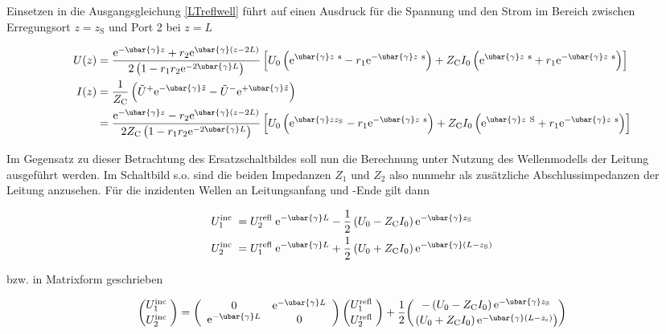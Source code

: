 Einsetzen in die Ausgangsgleichung \ref{LTreflwell} führt auf einen Ausdruck für die Spannung und den Strom im Bereich zwischen Erregungsort $z=z_{\mathrm{S}}$ und Port 2 bei $z=L$


\begin{align}
	U(z) & =\frac{\mathrm{e}^{-\ubar{\gamma} z}+r_{2} \mathrm{e}^{\ubar{\gamma}(z-2 L)}}{2\left(1-r_{1} r_{2} \mathrm{e}^{-2 \ubar{\gamma} L}\right)}\left[U_{0}\left(\mathrm{e}^{\ubar{\gamma} z \mathrm{~s}}-r_{1} \mathrm{e}^{-\ubar{\gamma} z \mathrm{~s}}\right)+Z_{\mathrm{C}} I_{0}\left(\mathrm{e}^{\ubar{\gamma} z \mathrm{~s}}+r_{1} \mathrm{e}^{-\ubar{\gamma} z \mathrm{~s}}\right)\right]  \\
	I(z) & =\frac{1}{Z_{\mathrm{C}}}\left(\tilde{U}^{+} \mathrm{e}^{-\ubar{\gamma} \tilde{z}}-\tilde{U}^{-} \mathrm{e}^{+\ubar{\gamma} \tilde{z}}\right)  \\
	& =\frac{\mathrm{e}^{-\ubar{\gamma} z}-r_{2} \mathrm{e}^{\ubar{\gamma}(z-2 L)}}{2 Z_{\mathrm{C}}\left(1-r_{1} r_{2} \mathrm{e}^{-2 \ubar{\gamma} L}\right)}\left[U_{0}\left(\mathrm{e}^{\ubar{\gamma} z z_{\mathrm{S}}}-r_{1} \mathrm{e}^{-\ubar{\gamma} z \mathrm{~s}}\right)+Z_{\mathrm{C}} I_{0}\left(\mathrm{e}^{\ubar{\gamma} z \mathrm{~S}}+r_{1} \mathrm{e}^{-\ubar{\gamma} z \mathrm{~s}}\right)\right] 
\end{align}


Im Gegensatz zu dieser Betrachtung des Ersatzschaltbildes soll nun die Berechnung unter Nutzung des Wellenmodells der Leitung ausgeführt werden. Im Schaltbild s.o. sind die beiden Impedanzen $Z_{1}$ und $Z_{2}$ also nunmehr als zusätzliche Abschlussimpedanzen der Leitung anzusehen. Für die inzidenten Wellen an Leitungsanfang und -Ende gilt dann


\begin{align}
	& U_{1}^{\text {inc }}=U_{2}^{\text {refl }} \mathrm{e}^{-\ubar{\gamma} L}-\frac{1}{2}\left(U_{0}-Z_{\mathrm{C}} I_{0}\right) \mathrm{e}^{-\ubar{\gamma} z_{\mathrm{S}}}  \\
	& U_{2}^{\text {inc }}=U_{1}^{\text {refl }} \mathrm{e}^{-\ubar{\gamma} L}+\frac{1}{2}\left(U_{0}+Z_{\mathrm{C}} I_{0}\right) \mathrm{e}^{-\ubar{\gamma}\left(L-z_{\mathrm{S}}\right)} 
\end{align}


bzw. in Matrixform geschrieben

\begin{equation}
	\binom{U_{1}^{\text {inc }}}{U_{2}^{\text {inc }}}=\left(\begin{array}{cc}
		0 & \mathrm{e}^{-\ubar{\gamma} L}  \\
		\mathrm{e}^{-\ubar{\gamma} L} & 0
	\end{array}\right)\binom{U_{1}^{\text {refl }}}{U_{2}^{\text {refl }}}+\frac{1}{2}\binom{-\left(U_{0}-Z_{\mathrm{C}} I_{0}\right) \mathrm{e}^{-\ubar{\gamma} z_{\mathrm{S}}}}{\left.\left(U_{0}+Z_{\mathrm{C}} I_{0}\right) \mathrm{e}^{-\ubar{\gamma}\left(L-z_{\mathrm{s}}\right)}\right)}
\end{equation}

